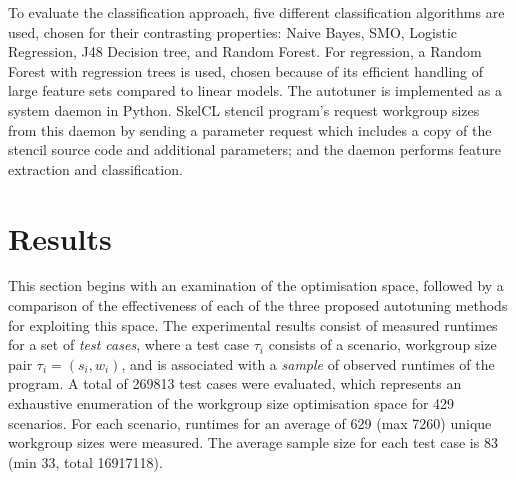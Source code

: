\documentclass[nonatbib,preprint,10pt]{sigplanconf}
\begin{document}
To evaluate the classification approach, five different classification
algorithms are used, chosen for their contrasting properties: Naive
Bayes, SMO, Logistic Regression, J48 Decision tree, and Random
Forest. For regression, a Random Forest with regression trees is used,
chosen because of its efficient handling of large feature sets
compared to linear models. The autotuner is implemented as a system
daemon in Python. SkelCL stencil program's request workgroup sizes
from this daemon by sending a parameter request which includes a copy
of the stencil source code and additional parameters; and the daemon
performs feature extraction and classification.



\section{Results}

This section begins with an examination of the optimisation space,
followed by a comparison of the effectiveness of each of the three
proposed autotuning methods for exploiting this space. The
experimental results consist of measured runtimes for a set of
\emph{test cases}, where a test case $\tau_i$ consists of a scenario,
workgroup size pair $\tau_i = (s_i,w_i)$, and is associated with a
\emph{sample} of observed runtimes of the program. A total of 269813
test cases were evaluated, which represents an exhaustive enumeration
of the workgroup size optimisation space for 429 scenarios. For each
scenario, runtimes for an average of 629 (max 7260) unique workgroup
sizes were measured. The average sample size for each test case is 83
(min 33, total 16917118).



\end{document}
